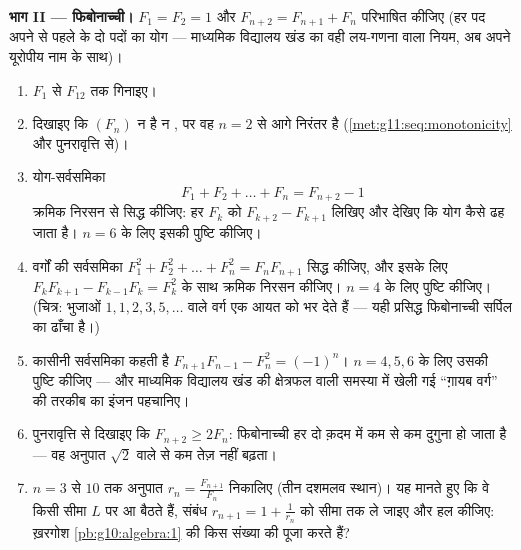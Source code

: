 \begin{problem}
\medskip
\noindent\textbf{भाग II --- फिबोनाच्ची।}
$F_1 = F_2 = 1$ और $F_{n+2} = F_{n+1} + F_n$ परिभाषित कीजिए (हर पद अपने से पहले के दो पदों का योग ---
माध्यमिक विद्यालय खंड का वही लय-गणना वाला नियम, अब अपने यूरोपीय नाम के साथ)।
\begin{enumerate}[resume]
  \item $F_1$ से $F_{12}$ तक गिनाइए।
  \item दिखाइए कि $(F_n)$ न  है न , पर वह $n = 2$ से आगे निरंतर
         है (\cref{met:g11:seq:monotonicity} और पुनरावृत्ति से)।
  \item योग-सर्वसमिका
        \[
        F_1 + F_2 + \dots + F_n = F_{n+2} - 1
        \]
        क्रमिक निरसन से सिद्ध कीजिए: हर $F_k$ को $F_{k+2} - F_{k+1}$ लिखिए और देखिए कि योग
        कैसे ढह जाता है। $n = 6$ के लिए इसकी पुष्टि कीजिए।
  \item वर्गों की सर्वसमिका $F_1^2 + F_2^2 + \dots + F_n^2 = F_n F_{n+1}$ सिद्ध कीजिए, और इसके लिए $F_k F_{k+1} - F_{k-1} F_k = F_k^2$ के साथ
        क्रमिक निरसन कीजिए। $n = 4$ के लिए पुष्टि कीजिए। (चित्र: भुजाओं $1, 1, 2, 3, 5, \dots$
        वाले वर्ग एक आयत को भर देते हैं --- यही प्रसिद्ध फिबोनाच्ची सर्पिल
        का ढाँचा है।)
  \item कासीनी सर्वसमिका कहती है $F_{n+1} F_{n-1} - F_n^2 = (-1)^n$। $n = 4, 5, 6$ के लिए उसकी पुष्टि कीजिए ---
        और माध्यमिक विद्यालय खंड की क्षेत्रफल वाली समस्या में खेली गई
        ``ग़ायब वर्ग'' की तरकीब का इंजन पहचानिए।
  \item पुनरावृत्ति से दिखाइए कि $F_{n+2} \geq 2 F_n$: फिबोनाच्ची हर दो क़दम में कम से कम
        दुगुना हो जाता है --- वह अनुपात $\sqrt2$ वाले  से कम
        तेज़ नहीं बढ़ता।
  \item $n = 3$ से $10$ तक अनुपात $r_n = \frac{F_{n+1}}{F_n}$ निकालिए (तीन दशमलव स्थान)। यह मानते
        हुए कि वे किसी सीमा $L$ पर आ बैठते हैं, संबंध $r_{n+1} = 1 + \frac{1}{r_n}$ को सीमा तक ले
        जाइए और हल कीजिए: ख़रगोश \cref{pb:g10:algebra:1} की किस संख्या की पूजा करते हैं?
\end{enumerate}


\end{problem}
